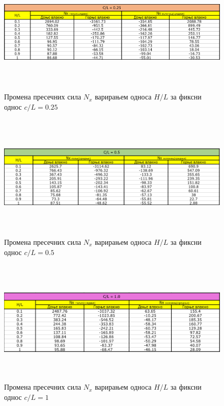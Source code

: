 \documentclass[11pt, a4paper]{article}
\begin{document}
\begin{figure}[H]
	\includegraphics[width=\textwidth, height=6cm]{Slike/Tabela_0.25.png}
	\caption{Промена пресечних сила $N_x$ варирањем односа $H/L$ за фиксни однос $c/L = 0.25$}
\end{figure}

\begin{figure}[H]
	\includegraphics[width=\textwidth, height=6cm]{Slike/Tabela_0.5.png}
	\caption{Промена пресечних сила $N_x$ варирањем односа $H/L$ за фиксни однос $c/L = 0.5$}
\end{figure}

\begin{figure}[H]
	\includegraphics[width=\textwidth, height=6cm]{Slike/Tabela_1.png}
	\caption{Промена пресечних сила $N_x$ варирањем односа $H/L$ за фиксни однос $c/L =1$}
\end{figure}
\end{document}
